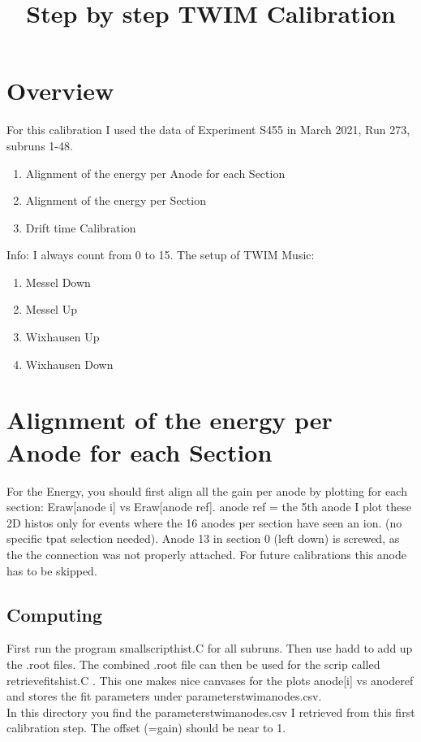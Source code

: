 \documentclass{report}
\title{Step by step TWIM Calibration}
\begin{document}
\maketitle

\section{Overview}
For this calibration I used the data of Experiment S455 in March 2021, Run 273, subruns 1-48.
\begin{enumerate}
	\item Alignment of the energy per Anode for each Section
	\item Alignment of the energy per Section
	\item Drift time Calibration
\end{enumerate}
Info: I always count from 0 to 15.\newline
The setup of TWIM Music:\newline
\begin{enumerate}\addtocounter{enumi}{-1}
	\item Messel Down
	\item Messel Up
	\item Wixhausen Up
	\item Wixhausen Down
\end{enumerate}

\section{Alignment of the energy per Anode for each Section}
For the Energy, you should first align all the gain per anode by plotting for each section:\newline 
Eraw[anode i] vs Eraw[anode ref].\newline
anode ref = the 5th anode\newline
I plot these 2D histos only for events where the 16 anodes per section have seen an ion. (no specific tpat selection needed).\newline
Anode 13 in section 0 (left down) is screwed, as the the connection was not properly attached. For future calibrations this anode has to be skipped.
\subsection{Computing}
First run the program \dq small\textunderscore script\textunderscore hist.C\dq{} for all subruns. Then use \dq hadd\dq{} to add up the .root
files. The combined .root file can then be used for the scrip called \dq retrieve\textunderscore fits\textunderscore hist.C \dq{}. This one makes nice canvases for the plots anode[i] vs anode\textunderscore ref and stores the fit parameters under 
parameters\textunderscore twim\textunderscore anodes.csv.\\
In this directory you find the parameters\textunderscore twim\textunderscore anodes.csv I retrieved from this first calibration step. The offset (=gain) should be near to 1.\newline
\end{document}
